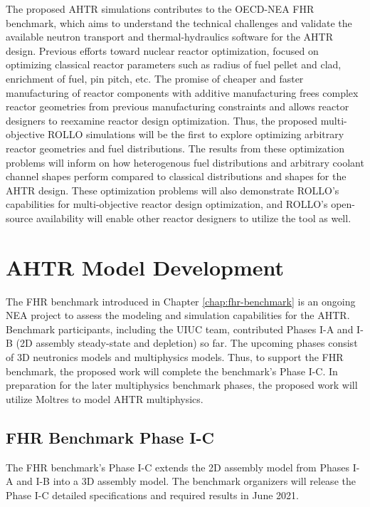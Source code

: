 The proposed \gls{AHTR} simulations contributes to the \gls{OECD}-\gls{NEA}
\gls{FHR} benchmark, which aims to understand the technical challenges and validate 
the available neutron transport and thermal-hydraulics software for the \gls{AHTR}
design.
Previous efforts toward nuclear reactor optimization, focused on optimizing 
classical reactor parameters such as radius of fuel pellet and clad, enrichment 
of fuel, pin pitch, etc. 
The promise of cheaper and faster manufacturing of reactor components with 
additive manufacturing frees complex reactor geometries from previous 
manufacturing constraints and allows reactor designers to reexamine reactor 
design optimization. 
Thus, the proposed multi-objective \gls{ROLLO} simulations will be the first 
to explore optimizing arbitrary reactor geometries and fuel distributions. 
The results from these optimization problems will inform on how heterogenous 
fuel distributions and arbitrary coolant channel shapes perform compared to 
classical distributions and shapes for the \gls{AHTR} design. 
These optimization problems will also demonstrate \gls{ROLLO}'s capabilities 
for multi-objective reactor design optimization, and \gls{ROLLO}'s open-source 
availability will enable other reactor designers to utilize the tool as well. 

\section{AHTR Model Development}
The \gls{FHR} benchmark introduced in Chapter \ref{chap:fhr-benchmark} is an 
ongoing \gls{NEA} project to assess the modeling and simulation capabilities 
for the \gls{AHTR}. 
Benchmark participants, including the \gls{UIUC} team, contributed Phases I-A 
and I-B (2D assembly steady-state and depletion) so far.  
The upcoming phases consist of 3D neutronics models and multiphysics models. 
Thus, to support the \gls{FHR} benchmark, the proposed work will complete the 
benchmark's Phase I-C.
In preparation for the later multiphysics benchmark phases, the proposed 
work will utilize Moltres to model \gls{AHTR} multiphysics.

\subsection{FHR Benchmark Phase I-C}
The \gls{FHR} benchmark's Phase I-C extends the 2D assembly model from Phases 
I-A and I-B into a 3D assembly model. 
The benchmark organizers will release the Phase I-C detailed specifications and 
required results in June 2021.

